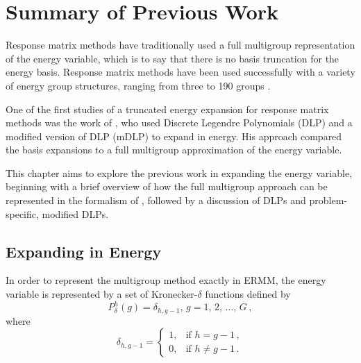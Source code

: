 
\chapter{Summary of Previous Work} %

\label{Chapter2} 


Response matrix methods have traditionally used a full multigroup 
representation of the energy variable, which is to say that there is no basis 
truncation for the energy basis.  Response matrix methods have been used 
successfully with a variety of energy group structures, ranging from three to 
190 groups \citep{ishii2009tdd, forget2006tdh, forget2004hcm}. 

One of the first studies of a truncated energy expansion for response matrix 
methods was the work of \citet{Roberts2014}, who used Discrete 
Legendre Polynomials (DLP) and a modified version of DLP (mDLP) to expand in 
energy. His approach compared the basis expansions to a full multigroup 
approximation of the energy variable.  

This chapter aims to explore the previous work in expanding the energy 
variable, beginning with a brief overview of how the full multigroup approach 
can be represented in the formalism of , followed by a 
discussion 
of DLPs and problem-specific, modified DLPs.


\section{Expanding in Energy}

In order to represent the multigroup method exactly in ERMM, the energy 
variable is represented by a set of Kronecker-$\delta$ functions defined by
\begin{equation}
  P_{\delta}^h(g) = \delta_{h, g-1},\, g=1,\, 2, \, \ldots,\, G \, ,
\end{equation}
where 
\begin{equation}
    \delta_{h, g-1} = 
    \begin{cases}
        1, & \text{if }  h = g-1 \, , \\
        0, & \text{if }  h \neq g-1 \, .
    \end{cases}
\end{equation}


